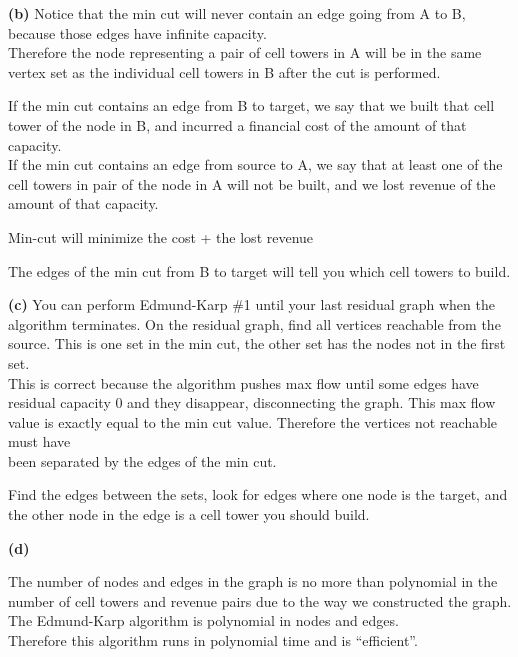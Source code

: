 \documentclass[11pt]{article}
\renewcommand{\part}[1] {\vspace{.10in} {\bf (#1)}}
\begin{document}
\part{b}
Notice that the min cut will never contain an edge going from A to B, because those edges have infinite capacity.\\
Therefore the node representing a pair of cell towers in A will be in the same vertex set as the individual cell towers in B after the cut is performed.

If the min cut contains an edge from B to target, we say that we built that cell tower of the node in B, and incurred a financial cost of the amount of that capacity.\\
If the min cut contains an edge from source to A, we say that at least one of the cell towers in pair of the node in A will not be built, and we lost revenue of the amount of that capacity.

Min-cut will minimize the cost + the lost revenue

The edges of the min cut from B to target will tell you which cell towers to build.

\part{c}
You can perform Edmund-Karp \#1 until your last residual graph when the algorithm terminates. On the residual graph, find all vertices reachable from the source. This is one set in the min cut, the other set has the nodes not in the first set.\\
This is correct because the algorithm pushes max flow until some edges have residual capacity 0 and they disappear, disconnecting the graph. This max flow value is exactly equal to the min cut value. Therefore the vertices not reachable must have \\
been separated by the edges of the min cut.

Find the edges between the sets, look for edges where one node is the target, and the other node in the edge is a cell tower you should build.

\part{d}

The number of nodes and edges in the graph is no more than polynomial in the number of cell towers and revenue pairs due to the way we constructed the graph.\\
The Edmund-Karp algorithm is polynomial in nodes and edges.\\
Therefore this algorithm runs in polynomial time and is ``efficient''.
\end{document}

